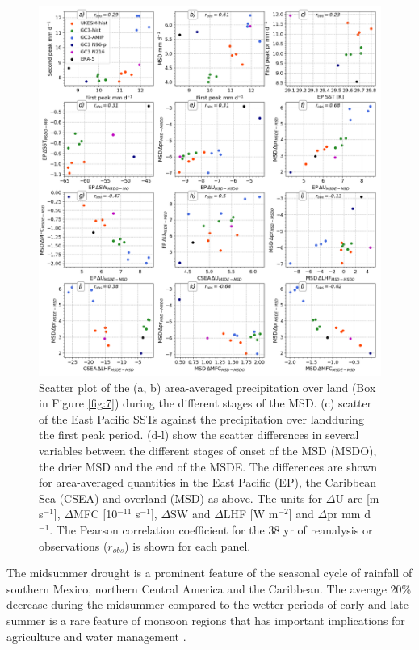  \begin{figure}[t!]
\includegraphics[width=\linewidth]{figures/scatter}
\caption{Scatter plot of the (a, b) area-averaged precipitation over land  (Box in Figure \ref{fig:7}) during the different stages of the MSD. (c) scatter of the East Pacific SSTs against  the precipitation over landduring the first peak period. (d-l) show the scatter differences in several variables between the different stages of onset of the MSD (MSDO), the drier MSD and the end of the MSDE. The differences are shown for area-averaged quantities in the East Pacific (EP), the Caribbean Sea (CSEA) and overland (MSD) as above. The units for $\Delta$U are [m s$^{-1}$], $\Delta$MFC [10$^{-11}$ s$^{-1}$], $\Delta$SW and $\Delta$LHF [W m$^{-2}$] and $\Delta$pr mm d$^{-1}$.   The Pearson correlation coefficient for the 38 yr of  reanalysis or observations ($r_{obs}$) is shown for each panel. }
\label{fig:scatter}
\end{figure}

The midsummer drought  is a  prominent feature of the seasonal cycle of rainfall of southern Mexico, northern Central America and the Caribbean. The average 20\%  decrease during the midsummer compared to the wetter periods of early and late summer is a rare feature of monsoon regions that has important implications for agriculture and water management  \citep{hellin2017,de2018,harvey2018}. 

